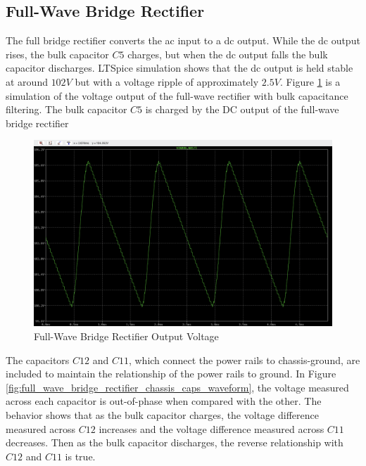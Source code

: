 \documentclass[conference]{IEEEtran}
\begin{document}
\FloatBarrier

\subsection{Full-Wave Bridge Rectifier}
The full bridge rectifier converts the ac input to a dc output. While the dc output rises, the bulk capacitor $C5$ charges, but when the dc output falls the bulk capacitor discharges. LTSpice simulation shows that the dc output is held stable at around $102V$ but with a voltage ripple of approximately $2.5V$. Figure \ref{fig:full_wave_bridge_rectifier_output_waveform} is a simulation of the voltage output of the full-wave rectifier with bulk capacitance filtering. The bulk capacitor $C5$ is charged by the DC output of the full-wave bridge rectifier

\begin{figure}[htp]
    \centering
    \includegraphics[width=1.0\linewidth]{full_wave_bridge_rectifier_output_waveform.png}
    \caption{Full-Wave Bridge Rectifier Output Voltage}
    \label{fig:full_wave_bridge_rectifier_output_waveform}
\end{figure}

The capacitors $C12$ and $C11$, which connect the power rails to chassis-ground, are included to maintain the relationship of the power rails to ground. In Figure \ref{fig:full_wave_bridge_rectifier_chassis_caps_waveform}, the voltage measured across each capacitor is out-of-phase when compared with the other. The behavior shows that as the bulk capacitor charges, the voltage difference measured across $C12$ increases and the voltage difference measured across $C11$ decreases. Then as the bulk capacitor discharges, the reverse relationship with $C12$ and $C11$ is true.
\end{document}
